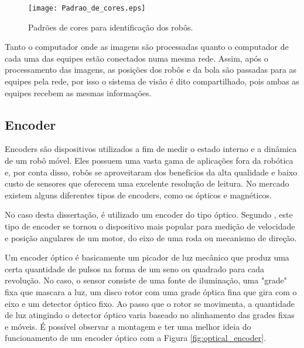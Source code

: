 \documentclass[acronym, symbols, table, deposito]{fei}
\begin{document}
				\begin{figure}[!htb]
					\centering
					\caption{Padrões de cores para identificação dos robôs.} 
					\texttt{[image: Padrao\_de\_cores.eps]}
					\label{fig:color_patterns}
				\end{figure}
			
				Tanto o computador onde as imagens são processadas quanto o computador de cada uma das equipes estão conectados numa mesma rede. Assim, após o processamento das imagens, as posições dos robôs e da bola são passadas para as equipes pela rede, por isso o sistema de visão é dito compartilhado, pois ambas as equipes recebem as mesmas informações.
			
			\subsection{Encoder}\label{sec:sensores_encoders}
				
				Encoders são dispositivos utilizados a fim de medir o estado interno e a dinâmica de um robô móvel. Eles possuem uma vasta gama de aplicações fora da robótica e, por conta disso, robôs se aproveitaram dos benefícios da alta qualidade e baixo custo de sensores que oferecem uma excelente resolução de leitura. No mercado existem alguns diferentes tipos de encoders, como os ópticos e magnéticos. 
				
				No caso desta dissertação, é utilizado um encoder do tipo óptico. Segundo \textcite{siegwart2011introduction}, este tipo de encoder se tornou o dispositivo mais popular para medição de velocidade e posição angulares de um motor, do eixo de uma roda ou mecanismo de direção.
				
				Um encoder óptico é basicamente um picador de luz mecânico que produz uma certa quantidade de pulsos na forma de um seno ou quadrado para cada revolução. No caso, o sensor consiste de uma fonte de iluminação, uma "grade" fixa que mascara a luz, um disco rotor com uma grade óptica fina que gira com o eixo e um detector óptico fixo. Ao passo que o rotor se movimenta, a quantidade de luz atingindo o detector óptico varia baseado no alinhamento das grades fixas e móveis. É possível observar a montagem e ter uma melhor ideia do funcionamento de um encoder óptico com a Figura \ref{fig:optical_encoder}.
				
\end{document}
